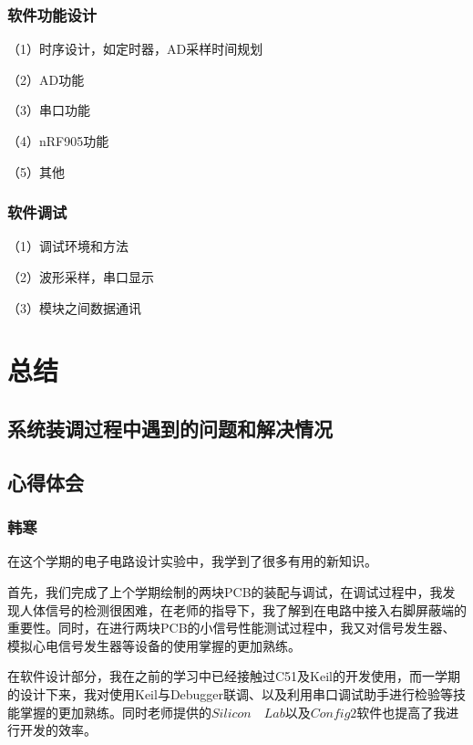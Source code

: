 \documentclass{zjureport}
\begin{document}
	\subsubsection{软件功能设计}
	
	（1）时序设计，如定时器，AD采样时间规划   
	    
	（2）AD功能                   
	              
	（3）串口功能              
	                
	（4）nRF905功能            
	            
	（5）其他
	
	
	\subsubsection{软件调试}
	
	（1）调试环境和方法
	
	（2）波形采样，串口显示   
	               
	（3）模块之间数据通讯      
	
	\section{总结}
	
	\subsection{系统装调过程中遇到的问题和解决情况}
	
	\subsection{心得体会}
	
	\subsubsection{韩寒}
	
	在这个学期的电子电路设计实验中，我学到了很多有用的新知识。
	
	首先，我们完成了上个学期绘制的两块PCB的装配与调试，在调试过程中，我发现人体信号的检测很困难，在老师的指导下，我了解到在电路中接入右脚屏蔽端的重要性。同时，在进行两块PCB的小信号性能测试过程中，我又对信号发生器、模拟心电信号发生器等设备的使用掌握的更加熟练。
	
	在软件设计部分，我在之前的学习中已经接触过C51及Keil的开发使用，而一学期的设计下来，我对使用Keil与Debugger联调、以及利用串口调试助手进行检验等技能掌握的更加熟练。同时老师提供的$Silicon \quad Lab$以及$Config2$软件也提高了我进行开发的效率。
	
\end{document}
